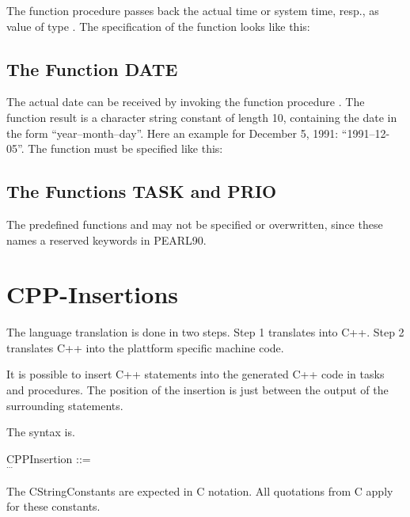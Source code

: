 The function procedure  passes back the actual time or system time, resp., 
as value of type . The specification of the function looks like this:\\

\code{ ;} 


\subsection{The Function DATE}    %
\label{sec_function_date}

The actual date can be received by invoking the function procedure .
The function result is a character string constant of length 10, containing
the date in the form ``year--month--day''. Here an example for December 5,
1991: ``1991--12-05''. The function must  be specified like this:\\

\code{ ;}

\subsection{ The Functions TASK and PRIO}
The predefined functions  and  may not be specified
 or overwritten, since these names a reserved keywords in PEARL90.

\section{CPP-Insertions}
The language translation is done in two steps.
Step 1 translates \OpenPEARL{} into C++.
Step 2 translates C++ into the plattform specific machine code.

It is possible to insert C++ statements into the generated C++ 
code in tasks and procedures. The position of the insertion is
just between the output of the surrounding
statements.

The syntax is.
\begin{grammarframe}
CPPInsertion ::=\\
\x {} \kw{(} $^{...}$ \kw{)} \kw{;}
\end{grammarframe}
The CStringConstants are expected in C notation.
All quotations from C apply for these constants.

